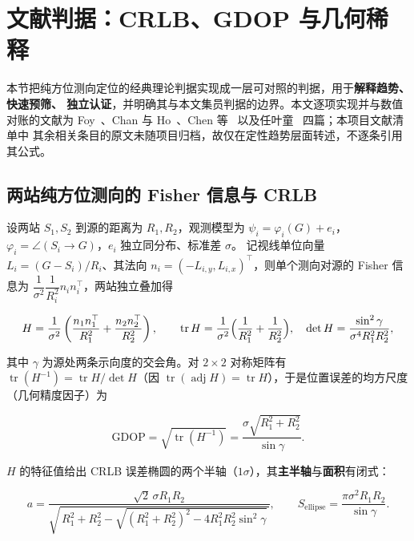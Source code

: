 \section{文献判据：CRLB、GDOP 与几何稀释}\label{sec:lit}

本节把纯方位测向定位的经典理论判据实现成一层可对照的判据，用于\textbf{解释趋势、快速预筛、
独立认证}，并明确其与本文集员判据的边界。本文逐项实现并与数值对账的文献为
Foy~\cite{foy1976}、Chan 与 Ho~\cite{chan1994}、Chen 等~\cite{chen2009} 以及任叶童~\cite{ren2016} 四篇；本项目文献清单中
其余相关条目的原文未随项目归档，故仅在定性趋势层面转述，不逐条引用其公式。

\subsection{两站纯方位测向的 Fisher 信息与 CRLB}

设两站 $S_1,S_2$ 到源的距离为 $R_1,R_2$，观测模型为
$\psi_i=\varphi_i(G)+e_i$，$\varphi_i=\angle(S_i\!\to\!G)$，$e_i$ 独立同分布、标准差 $\sigma$。
记视线单位向量 $L_i=(G-S_i)/R_i$、其法向 $n_i=(-L_{i,y},L_{i,x})^\top$，则单个测向对源的
Fisher 信息为 $\dfrac{1}{\sigma^2}\dfrac{1}{R_i^2}n_in_i^\top$，两站独立叠加得

\begin{equation}
  H=\frac{1}{\sigma^2}\left(\frac{n_1n_1^\top}{R_1^2}+\frac{n_2n_2^\top}{R_2^2}\right),
  \qquad
  \operatorname{tr}H=\frac{1}{\sigma^2}\Bigl(\frac{1}{R_1^2}+\frac{1}{R_2^2}\Bigr),\quad
  \det H=\frac{\sin^2\gamma}{\sigma^4R_1^2R_2^2},
  \label{eq:fim}
\end{equation}

其中 $\gamma$ 为源处两条示向度的交会角。对 $2\times2$ 对称矩阵有
$\operatorname{tr}(H^{-1})=\operatorname{tr}H/\det H$（因 $\operatorname{tr}(\operatorname{adj}H)
=\operatorname{tr}H$），于是位置误差的均方尺度（几何精度因子）为

\begin{equation}
  \mathrm{GDOP}=\sqrt{\operatorname{tr}(H^{-1})}
  =\frac{\sigma\sqrt{R_1^2+R_2^2}}{\sin\gamma}.
  \label{eq:gdop}
\end{equation}

$H$ 的特征值给出 CRLB 误差椭圆的两个半轴（$1\sigma$），其\textbf{主半轴}与\textbf{面积}有闭式：

\begin{equation}
  a=\frac{\sqrt2\,\sigma R_1R_2}
  {\sqrt{\,R_1^2+R_2^2-\sqrt{(R_1^2+R_2^2)^2-4R_1^2R_2^2\sin^2\gamma}\,}},
  \qquad
  S_{\mathrm{ellipse}}=\frac{\pi\sigma^2R_1R_2}{\sin\gamma}.
  \label{eq:crlb}
\end{equation}

